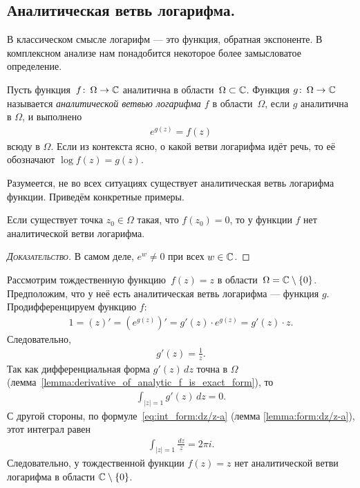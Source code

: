 \documentclass[../complex-analysis.tex]{subfiles}
\begin{document}
\subsection{Аналитическая ветвь логарифма.}

В классическом смысле логарифм --- это функция, обратная экспоненте. В комплексном анализе нам понадобится некоторое более замысловатое определение.

\begin{df}
 Пусть функция~$ f\colon\,\Omega\to\mathbb{C} $ аналитична в области~$ \Omega \subset \mathbb{C} $. Функция $ g\colon\,\Omega\to\mathbb{C} $ называется \emph{аналитической ветвью логарифма $ f $} в области~$ \Omega $, если $ g $ аналитична в $ \Omega $, и выполнено
 \begin{align*}
  e^{g(z)} = f(z)
 \end{align*} всюду в $ \Omega $. Если из контекста ясно, о какой ветви логарифма идёт речь, то её обозначают $ \log f(z) = g(z) $.
\end{df}

Разумеется, не во всех ситуациях существует аналитическая ветвь логарифма функции. Приведём конкретные примеры.

\begin{remrk}
 Если существует точка $ z_0 \in \Omega $ такая, что $ f(z_0) = 0 $, то у функции $ f $ нет аналитической ветви логарифма. 
\end{remrk}
\begin{proof}[\normalfont\textsc{Доказательство}]
 В самом деле, $ e^{w} \neq 0 $ при всех $ w \in \mathbb{C} $.
\end{proof}

\begin{exmpl}
 Рассмотрим тождественную функцию~$ f(z)=z $ в области~$ \Omega = \mathbb{C} \setminus \left\{ 0 \right\} $. Предположим, что у неё есть аналитическая ветвь логарифма --- функция $ g  $. Продифференцируем функцию $ f $:
 \begin{align*}
  1 = (z)' = (e^{g(z)})' = g'(z) \cdot e^{g(z)} = g'(z) \cdot z.
 \end{align*} Следовательно,
 \begin{align*}
  g'(z) = \frac{1}{z}.
 \end{align*} Так как дифференциальная форма $ g'(z)\,dz $ точна в $ \Omega $ (лемма~\ref{lemma:derivative_of_analytic_f_is_exact_form}), то
 \begin{align*}
  \int_{\left| z \right|=1} g'(z)\,dz = 0.
 \end{align*} С другой стороны, по формуле~\eqref{eq:int_form:dz/z-a} (лемма \ref{lemma:form:dz/z-a}), этот интеграл равен
 \begin{align*}
  \int_{\left| z \right|=1}   \frac{dz}{z} = 2\pi i.
 \end{align*} Следовательно, у тождественной функции $ f(z) = z $ нет аналитической ветви логарифма в области $ \mathbb{C} \setminus \left\{ 0 \right\} $.
\end{exmpl}
\end{document}
